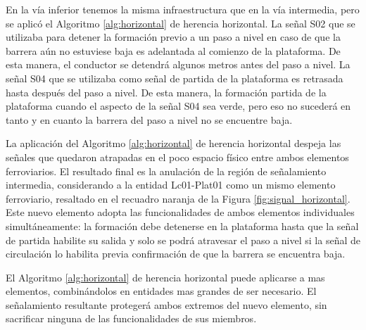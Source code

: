 En la vía inferior tenemos la misma infraestructura que en la vía intermedia, pero se aplicó el Algoritmo \ref{alg:horizontal} de herencia horizontal. La señal S02 que se utilizaba para detener la formación previo a un paso a nivel en caso de que la barrera aún no estuviese baja es adelantada al comienzo de la plataforma. De esta manera, el conductor se detendrá algunos metros antes del paso a nivel. La señal S04 que se utilizaba como señal de partida de la plataforma es retrasada hasta después del paso a nivel. De esta manera, la formación partida de la plataforma cuando el aspecto de la señal S04 sea verde, pero eso no sucederá en tanto y en cuanto la barrera del paso a nivel no se encuentre baja.

La aplicación del Algoritmo \ref{alg:horizontal} de herencia horizontal despeja las señales que quedaron atrapadas en el poco espacio físico entre ambos elementos ferroviarios. El resultado final es la anulación de la región de señalamiento intermedia, considerando a la entidad Lc01-Plat01 como un mismo elemento ferroviario, resaltado en el recuadro naranja de la Figura \ref{fig:signal_horizontal}. Este nuevo elemento adopta las funcionalidades de ambos elementos individuales simultáneamente: la formación debe detenerse en la plataforma hasta que la señal de partida habilite su salida y solo se podrá atravesar el paso a nivel si la señal de circulación lo habilita previa confirmación de que la barrera se encuentra baja.

El Algoritmo \ref{alg:horizontal} de herencia horizontal puede aplicarse a mas elementos, combinándolos en entidades mas grandes de ser necesario. El señalamiento resultante protegerá ambos extremos del nuevo elemento, sin sacrificar ninguna de las funcionalidades de sus miembros.